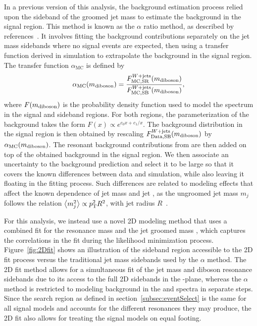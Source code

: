 In a previous version of this analysis, the background estimation process relied upon the sideband of the groomed jet mass \MJ to estimate the background in the signal region.
This method is known as the $\alpha$ ratio method, as described by references~\cite{Khachatryan_14,Sirunyan_17}.
It involves fitting the background contributions separately on the jet mass sidebands where no signal events are expected, then using a transfer function derived in simulation to extrapolate the background in the signal region.
The transfer function $\alpha_\mathrm{MC}$ is defined by
\begin{equation}
  \alpha_\mathrm{MC}(m_\mathrm{diboson})=\frac{F_\mathrm{MC,SR}^{W+\text{jets}}(m_\mathrm{diboson})}{F_\mathrm{MC,SB}^{W+\text{jets}}(m_\mathrm{diboson})},
\end{equation}
where $F(m_\mathrm{diboson})$ is the probability density function used to model the \MVV spectrum in the signal and sideband regions.
For both regions, the parameterization of the background takes the form $F(x)\propto e^{c_0x+c_1/x}$.
The \Wjets background distribution in the signal region is then obtained by rescaling $F_\mathrm{Data,SB}^{W+\text{jets}}(m_\mathrm{diboson})$ by $\alpha_\mathrm{MC}(m_\mathrm{diboson})$.
The resonant background contributions from \WVt are then added on top of the obtained \Wjets background in the signal region.
We then associate an uncertainty to the background prediction and select it to be large so that it covers the known differences between data and simulation, while also leaving it floating in the fitting process.
Such differences are related to modeling effects that affect the known dependence of jet mass and jet \pt, as the ungroomed jet mass $m_j$ follows the relation $\ev{m_j^2}\propto\pt^2R^2$, with jet radius $R$~\cite{shelton2013tasi}.

For this analysis, we instead use a novel 2D modeling method that uses a combined fit for the resonance mass \MVV and the jet groomed mass \MJ, which captures the correlations in the fit during the likelihood minimization process.
Figure~\ref{fig:2Dfit} shows an illustration of the sideband region accessible to the 2D fit process versus the traditional jet mass sidebands used by the $\alpha$ method.
The 2D fit method allows for a simultaneous fit of the jet mass and diboson resonance sidebands due to its access to the full 2D sidebands in the \MVV-\MJ plane, whereas the $\alpha$ method is restricted to modeling background in the \MVV and \MJ spectra in separate steps.
Since the search region as defined in section~\ref{subsec:eventSelect} is the same for all signal models and accounts for the different resonances they may produce, the 2D fit also allows for treating the signal models on equal footing.

